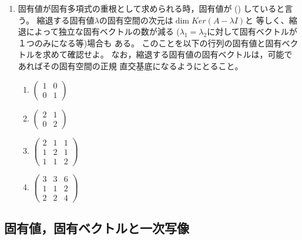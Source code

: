 \documentclass[twocolumn,11pt]{jarticle}
\begin{document}
\begin{enumerate}
\item 
  固有値が固有多項式の重根として求められる時，固有値が
  ()
  していると言う。
  縮退する固有値$\lambda$の固有空間の次元は$\dim Ker (A-\lambda I)$と
  等しく、縮退によって独立な固有ベクトルの数が減る
  ($\lambda_1=\lambda_2$に対して固有ベクトルが１つのみになる等)場合も
  ある。
  このことを以下の行列の固有値と固有ベクトルを求めて確認せよ。
  なお，縮退する固有値の固有ベクトルは，可能であればその固有空間の正規
  直交基底になるようにとること。
  \begin{enumerate}
  \item $\begin{pmatrix}
      1 & 0\\
      0 & 1
    \end{pmatrix}$
  \item $\begin{pmatrix}
      2 & 1\\
      0 & 2
    \end{pmatrix}$
  \item $\begin{pmatrix}
      2 & 1 & 1\\
      1 & 2 & 1\\
      1 & 1 & 2
    \end{pmatrix}$
  \item $\begin{pmatrix}
      3 & 3 & 6\\
      1 & 1 & 2\\
      2 & 2 & 4
    \end{pmatrix}$
  \end{enumerate}
\end{enumerate}%

\subsection{固有値，固有ベクトルと一次写像\label{sec:eigen_mapping}}
\end{document}
